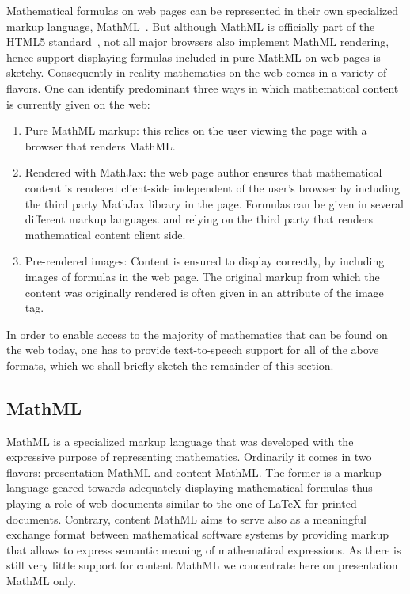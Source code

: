 \documentclass{sig-alternate}
\begin{document}
Mathematical formulas on web pages can be represented in their own specialized
markup language, MathML~\cite{MathML3}. But although MathML is officially part
of the HTML5 standard~\cite{HTML5}, not all major browsers also implement MathML
rendering, hence support displaying formulas included in pure MathML on web
pages is sketchy. Consequently in reality mathematics on the web comes in a
variety of flavors. One can identify predominant three ways in which
mathematical content is currently given on the web:
\begin{enumerate}
\item Pure MathML markup: this relies on the user viewing the
  page with a browser that renders MathML.
\item Rendered with MathJax: the web page author ensures that mathematical
  content is rendered client-side independent of the user's browser by including
  the third party MathJax library in the page. Formulas can be given in several
  different markup languages.  and relying on the third party that renders
  mathematical content client side.
\item Pre-rendered images: Content is ensured to display correctly, by including
  images of formulas in the web page. The original markup from which the content
  was originally rendered is often given in an attribute of the image tag.
\end{enumerate}

In order to enable access to the majority of mathematics that can be found on
the web today, one has to provide text-to-speech support for all of the above
formats, which we shall briefly sketch the remainder of this section.

\subsection{MathML}
\label{sec:mathml}

MathML is a specialized markup language that was developed with the expressive
purpose of representing mathematics. Ordinarily it comes in two flavors:
presentation MathML and content MathML. The former is a markup language geared
towards adequately displaying mathematical formulas thus playing a role of web
documents similar to the one of {\LaTeX} for printed documents.  Contrary,
content MathML aims to serve also as a meaningful exchange format between
mathematical software systems by providing markup that allows to express
semantic meaning of mathematical expressions. As there is still very little
support for content MathML we concentrate here on presentation MathML only.
  
\end{document}
